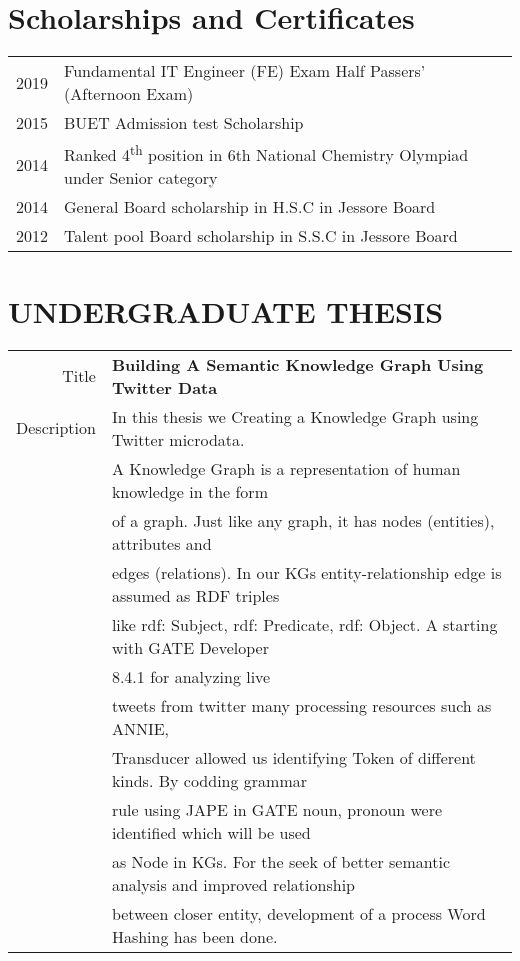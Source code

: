 \documentclass[a4paper,10pt]{article}
\begin{document}
\section{Scholarships and Certificates}
\begin{tabular}{rl}
2019 &  Fundamental IT Engineer (FE) Exam Half Passers’ (Afternoon Exam)\\
 2015 & BUET Admission test Scholarship\\
 2014 &  Ranked 4\textsuperscript{th} position in 6th National Chemistry Olympiad under Senior category \\
 2014 & General Board scholarship in H.S.C in Jessore Board \\
 2012 & Talent pool Board scholarship in S.S.C in Jessore Board\\
\end{tabular}


\section{UNDERGRADUATE THESIS}
\begin{tabular}{rl}
Title &  \textbf{Building A Semantic Knowledge Graph Using Twitter Data}\\
Description & In this thesis we Creating a Knowledge Graph using Twitter microdata. \\
& A Knowledge Graph is a representation of human knowledge in the form \\
& of a graph. Just like any graph, it has nodes (entities), attributes and \\
& edges (relations). In our KGs entity-relationship edge is assumed as RDF triples \\
&  like rdf: Subject, rdf: Predicate, rdf: Object. A starting with GATE Developer \\
& 8.4.1 for analyzing live \\
& tweets from twitter many processing resources such as ANNIE,\\
&  Transducer allowed us identifying Token of different kinds. By codding grammar \\
& rule using JAPE in GATE noun, pronoun were identified which will be used\\
&  as Node in KGs. For the seek of better semantic analysis and improved relationship\\
&  between closer entity, development of a process Word Hashing has been done. \\
\end{tabular}
\end{document}
